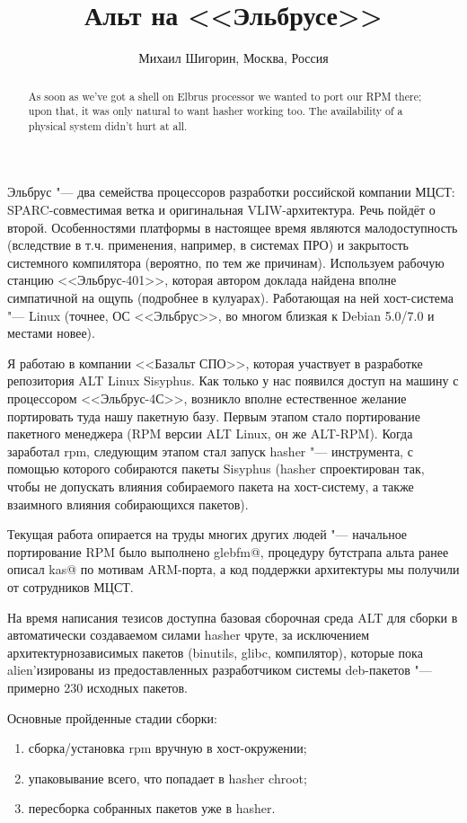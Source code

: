 \documentclass[10pt, a5paper]{article}
\begin{document}
\title{Альт на <<Эльбрусе>>}
\author{Михаил Шигорин, Москва, Россия}
\maketitle
\begin{abstract}
As soon as we've got a shell on Elbrus processor we wanted to port our RPM there; upon that, it was only natural to want hasher working too. The availability of a physical system didn't hurt at all.
\end{abstract}
Эльбрус "--- два семейства процессоров разработки российской компании МЦСТ: SPARC-совместимая ветка и оригинальная VLIW-архитектура. Речь пойдёт о второй. Особенностями платформы в настоящее время являются малодоступность (вследствие в т.ч. применения, например, в системах ПРО) и закрытость системного компилятора (вероятно, по тем же причинам). Используем рабочую станцию <<Эльбрус-401>>, которая автором доклада найдена вполне симпатичной на ощупь (подробнее в кулуарах). Работающая на ней хост-система "--- Linux (точнее, ОС <<Эльбрус>>, во многом близкая к Debian 5.0/7.0 и местами новее).

Я работаю в компании <<Базальт СПО>>, которая участвует в разработке репозитория ALT Linux Sisyphus. Как только у нас появился доступ на машину с процессором <<Эльбрус-4С>>, возникло вполне естественное желание портировать туда нашу пакетную базу. Первым этапом стало портирование пакетного менеджера (RPM версии ALT Linux, он же ALT-RPM). Когда заработал rpm, следующим этапом стал запуск hasher "--- инструмента, с помощью которого собираются пакеты Sisyphus (hasher спроектирован так, чтобы не допускать влияния собираемого пакета на хост-систему, а также взаимного влияния собирающихся пакетов).

Текущая работа опирается на труды многих других людей "---  начальное портирование RPM было выполнено glebfm@, процедуру бутстрапа альта ранее описал kas@ по мотивам ARM-порта, а код поддержки архитектуры мы получили от сотрудников МЦСТ.

На время написания тезисов доступна базовая сборочная среда ALT для сборки в автоматически создаваемом силами hasher чруте, за исключением архитектурнозависимых пакетов (binutils, glibc, компилятор), которые пока alien'изированы из предоставленных разработчиком системы deb-пакетов "---  примерно 230 исходных пакетов.

Основные пройденные стадии сборки:

\begin{enumerate}
  \item сборка/установка rpm вручную в хост-окружении;
  \item упаковывание всего, что попадает в hasher chroot;
  \item пересборка собранных пакетов уже в hasher.
\end{enumerate}
\end{document}
